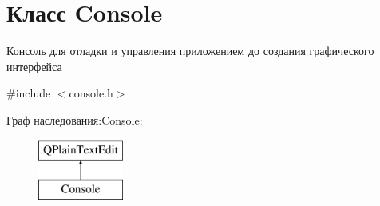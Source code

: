 \hypertarget{class_console}{}\section{Класс Console}
\label{class_console}


Консоль для отладки и управления приложением до создания графического интерфейса  




{\ttfamily \#include $<$console.\+h$>$}

Граф наследования\+:Console\+:\begin{figure}[H]
\begin{center}
\leavevmode
\includegraphics[height=2.000000cm]{class_console}
\end{center}
\end{figure}
